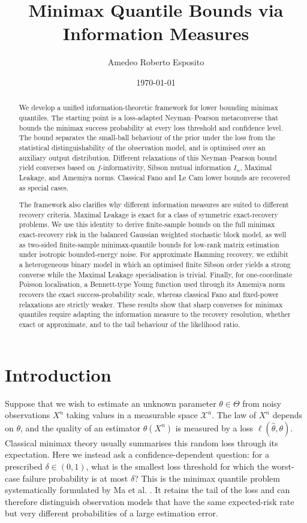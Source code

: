 \documentclass[11pt]{article}
\title{Minimax Quantile Bounds via Information Measures}
\author{Amedeo Roberto Esposito}
\date{\today}
\theoremstyle{definition}
\theoremstyle{remark}
\newcommand{\1}{\boldsymbol{1}}
\begin{document}
\maketitle

\begin{abstract}
We develop a unified information-theoretic framework for lower bounding
minimax quantiles. The starting point is a loss-adapted
Neyman--Pearson metaconverse that bounds the minimax success probability
at every loss threshold and confidence level. The bound separates the
small-ball behaviour of the prior under the loss from the statistical
distinguishability of the observation model, and is optimised over an auxiliary
output distribution. Different relaxations of this Neyman--Pearson bound
yield converses based on \(f\)-informativity, Sibson mutual information
\(I_\alpha\), Maximal Leakage, and Amemiya norms. Classical Fano and
Le Cam lower bounds are recovered as special cases.

The framework also clarifies why different information measures are
suited to different recovery criteria. Maximal Leakage is exact for a
class of symmetric exact-recovery problems. We use this identity to
derive finite-sample bounds on the full minimax exact-recovery risk in
the balanced Gaussian weighted stochastic block model, as well as
two-sided finite-sample minimax-quantile bounds for low-rank matrix
estimation under isotropic bounded-energy noise. For approximate Hamming
recovery, we exhibit a heterogeneous binary model in which an optimised
finite Sibson order yields a strong converse while the Maximal Leakage
specialisation is trivial. Finally, for one-coordinate Poisson
localisation, a Bennett-type Young function used through its Amemiya norm
recovers the exact success-probability scale, whereas classical Fano and
fixed-power relaxations are strictly weaker. These results show that sharp
converses for minimax quantiles require adapting the information measure to
the recovery resolution, whether exact or approximate, and to the tail
behaviour of the likelihood ratio.
\end{abstract}

\section{Introduction}
Suppose that we wish to estimate an unknown parameter
\(\theta\in\Theta\) from noisy observations \(X^n\) taking values in a
measurable space \(\mathcal X^n\). The law of \(X^n\) depends on
\(\theta\), and the quality of an estimator \(\widehat\theta(X^n)\) is
measured by a loss \(\ell(\widehat\theta,\theta)\). Classical minimax
theory usually summarises this random loss through its expectation.
Here we instead ask a confidence-dependent question: for a prescribed
\(\delta\in(0,1)\), what is the smallest loss threshold for which the
worst-case failure probability is at most \(\delta\)? This is the minimax
quantile problem systematically formulated by Ma et al.
\cite{MaVerchandSamworth2024}. It retains the tail of the loss and can
therefore distinguish observation models that have the same expected-risk rate
but very different probabilities of a large estimation error.
\end{document}
